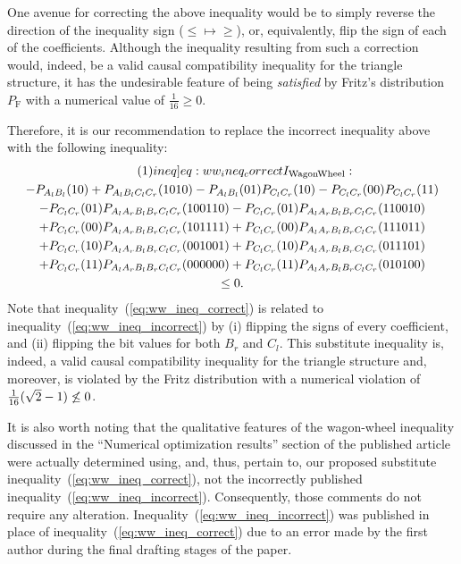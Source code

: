 \documentclass[aps, 10pt, english, twoside, pra, nofootinbib, tightenlines, longbibliography, superscriptaddress, notitlepage]{revtex4-1}
\begin{document}
    One avenue for correcting the above inequality would be to simply reverse the direction of the inequality sign ($\leq \mapsto \geq$), or, equivalently, flip the sign of each of the coefficients. Although the inequality resulting from such a correction would, indeed, be a valid causal compatibility inequality for the triangle structure, it has the undesirable feature of being \textit{satisfied} by Fritz's distribution $P_{\text{F}}$ with a numerical value of $\frac{1}{16} \geq 0$.

    Therefore, it is our recommendation to replace the incorrect inequality above with the following inequality:
    \begin{equation*}
    \begin{gathered}
        \eq\label[ineq]{eq:ww_ineq_correct}
        I\tsb{WagonWheel} : \\
        -P_{A_{l}B_{l}}(10)
        +P_{A_{l}B_{l}C_{l}C_{r}}(1010)
        -P_{A_{l}B_{l}}(01) P_{C_{l}C_{r}}(10)
        -P_{C_{l}C_{r}}(00) P_{C_{l}C_{r}}(11) \\
        -P_{C_{l}C_{r}}(01) P_{A_{l}A_{r}B_{l}B_{r}C_{l}C_{r}}(100110)
        -P_{C_{l}C_{r}}(01) P_{A_{l}A_{r}B_{l}B_{r}C_{l}C_{r}}(110010) \\
        +P_{C_{l}C_{r}}(00) P_{A_{l}A_{r}B_{l}B_{r}C_{l}C_{r}}(101111)
        +P_{C_{l}C_{r}}(00) P_{A_{l}A_{r}B_{l}B_{r}C_{l}C_{r}}(111011) \\
        +P_{C_{l}C_{r}}(10) P_{A_{l}A_{r}B_{l}B_{r}C_{l}C_{r}}(001001)
        +P_{C_{l}C_{r}}(10) P_{A_{l}A_{r}B_{l}B_{r}C_{l}C_{r}}(011101) \\
        +P_{C_{l}C_{r}}(11) P_{A_{l}A_{r}B_{l}B_{r}C_{l}C_{r}}(000000)
        +P_{C_{l}C_{r}}(11) P_{A_{l}A_{r}B_{l}B_{r}C_{l}C_{r}}(010100) \\
        \leq 0.
    \end{gathered}
    \end{equation*}
    Note that inequality~(\ref{eq:ww_ineq_correct}) is related to inequality~(\ref{eq:ww_ineq_incorrect}) by (i) flipping the signs of every coefficient, and (ii) flipping the bit values for both $B_r$ and $C_l$. This substitute inequality is, indeed, a valid causal compatibility inequality for the triangle structure and, moreover, is violated by the Fritz distribution with a numerical violation of $\frac{1}{16}(\sqrt{2} - 1) \not \leq 0$. 
    
    It is also worth noting that the qualitative features of the wagon-wheel inequality discussed in the ``Numerical optimization results'' section of the published article were actually determined using, and, thus, pertain to, our proposed substitute inequality~(\ref{eq:ww_ineq_correct}), not the incorrectly published inequality~(\ref{eq:ww_ineq_incorrect}). Consequently, those comments do not require any alteration. Inequality~(\ref{eq:ww_ineq_incorrect}) was published in place of inequality~(\ref{eq:ww_ineq_correct}) due to an error made by the first author during the final drafting stages of the paper.
\end{document}
